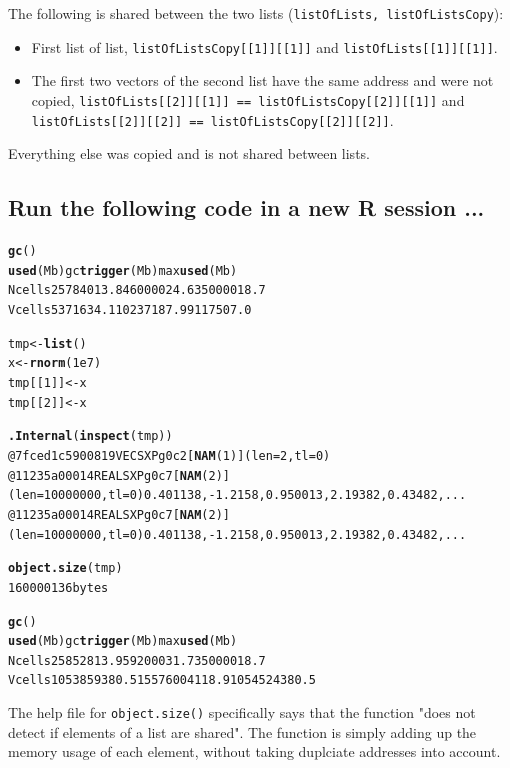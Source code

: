 \documentclass{article}\usepackage[]{graphicx}\usepackage[]{color}
\makeatletter
\newcommand{\hlkwd}[1]{\textcolor[rgb]{0.737,0.353,0.396}{\textbf{#1}}}%
\newenvironment{kframe}{%
 \def\at@end@of@kframe{}%
 \ifinner\ifhmode%
  \def\at@end@of@kframe{\end{minipage}}%
  \begin{minipage}{\columnwidth}%
 \fi\fi%
 \def\FrameCommand##1{\hskip\@totalleftmargin \hskip-\fboxsep
 \colorbox{shadecolor}{##1}\hskip-\fboxsep
     \hskip-\linewidth \hskip-\@totalleftmargin \hskip\columnwidth}%
 \MakeFramed {\advance\hsize-\width
   \@totalleftmargin\z@ \linewidth\hsize
   \@setminipage}}%
 {\par\unskip\endMakeFramed%
 \at@end@of@kframe}
\newenvironment{knitrout}{}{} %
\makeatother
\begin{document}
The following is shared between the two lists (\texttt{listOfLists, listOfListsCopy}):
\begin{itemize}
    \item First list of list, \texttt{listOfListsCopy[[1]][[1]]} and \texttt{listOfLists[[1]][[1]]}.
    \item The first two vectors of the second list have the same address and were not copied, \texttt{listOfLists[[2]][[1]] == listOfListsCopy[[2]][[1]]} and \texttt{listOfLists[[2]][[2]] == listOfListsCopy[[2]][[2]]}.
\end{itemize}
Everything else was copied and is not shared between lists.

\subsection{Run the following code in a new R session ...} %

\begin{knitrout}
\color{fgcolor}\begin{kframe}
\begin{alltt}
\hlkwd{gc}()
         \hlkwd{used} (Mb) gc \hlkwd{trigger} (Mb) max \hlkwd{used} (Mb)
Ncells 257840 13.8     460000 24.6   350000 18.7
Vcells 537163  4.1    1023718  7.9   911750  7.0

tmp <- \hlkwd{list}()
x <- \hlkwd{rnorm}(1e7)
tmp[[1]] <- x
tmp[[2]] <- x

\hlkwd{.Internal}(\hlkwd{inspect}(tmp))
@7fced1c59008 19 VECSXP g0c2 [\hlkwd{NAM}(1)] (len=2, tl=0)
  @11235a000 14 REALSXP g0c7 [\hlkwd{NAM}(2)] (len=10000000, tl=0) 0.401138,-1.2158,0.950013,2.19382,0.43482,...
  @11235a000 14 REALSXP g0c7 [\hlkwd{NAM}(2)] (len=10000000, tl=0) 0.401138,-1.2158,0.950013,2.19382,0.43482,...

\hlkwd{object.size}(tmp)
160000136 bytes

\hlkwd{gc}()
           \hlkwd{used} (Mb) gc \hlkwd{trigger}  (Mb) max \hlkwd{used} (Mb)
Ncells   258528 13.9     592000  31.7   350000 18.7
Vcells 10538593 80.5   15576004 118.9 10545243 80.5
\end{alltt}
\end{kframe}
\end{knitrout}
The help file for \texttt{object.size()} specifically says that the function "does not detect if elements of a list are shared". The function is simply adding up the memory usage of each element, without taking duplciate addresses into account.
\end{document}
